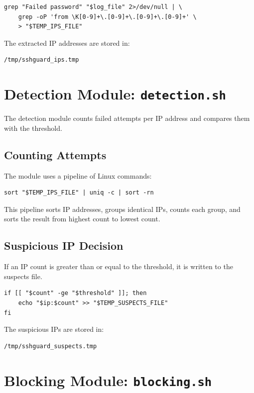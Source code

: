 \documentclass[12pt,a4paper]{article}
\begin{document}
\begin{lstlisting}[style=bashstyle]
grep "Failed password" "$log_file" 2>/dev/null | \
    grep -oP 'from \K[0-9]+\.[0-9]+\.[0-9]+\.[0-9]+' \
    > "$TEMP_IPS_FILE"
\end{lstlisting}

The extracted IP addresses are stored in:

\begin{lstlisting}[style=bashstyle]
/tmp/sshguard_ips.tmp
\end{lstlisting}

\section{Detection Module: \texttt{detection.sh}}

The detection module counts failed attempts per IP address and compares them with the
threshold.

\subsection{Counting Attempts}

The module uses a pipeline of Linux commands:

\begin{lstlisting}[style=bashstyle]
sort "$TEMP_IPS_FILE" | uniq -c | sort -rn
\end{lstlisting}

This pipeline sorts IP addresses, groups identical IPs, counts each group, and sorts the
result from highest count to lowest count.

\subsection{Suspicious IP Decision}

If an IP count is greater than or equal to the threshold, it is written to the suspects file.

\begin{lstlisting}[style=bashstyle]
if [[ "$count" -ge "$threshold" ]]; then
    echo "$ip:$count" >> "$TEMP_SUSPECTS_FILE"
fi
\end{lstlisting}

The suspicious IPs are stored in:

\begin{lstlisting}[style=bashstyle]
/tmp/sshguard_suspects.tmp
\end{lstlisting}

\section{Blocking Module: \texttt{blocking.sh}}
\end{document}
